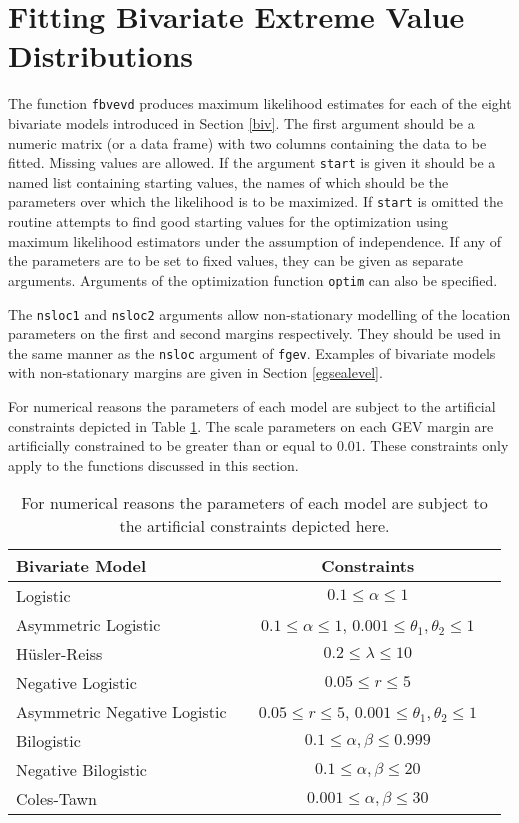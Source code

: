 \documentclass[11pt,a4paper]{article}
\begin{document}
\section{Fitting Bivariate Extreme Value Distributions}
\setcounter{footnote}{0}
\label{bivfit}

The function \verb+fbvevd+ produces maximum likelihood estimates for each of the eight bivariate models introduced in Section \ref{biv}.
The first argument should be a numeric matrix (or a data frame) with two columns containing the data to be fitted.
Missing values are allowed.
If the argument \verb+start+ is given it should be a named list containing starting values, the names of which should be the parameters over which the likelihood is to be maximized.
If \verb+start+ is omitted the routine attempts to find good starting values for the optimization using maximum likelihood estimators under the assumption of independence.
If any of the parameters are to be set to fixed values, they can be given as separate arguments.
Arguments of the optimization function \verb+optim+ can also be specified.

The \verb+nsloc1+ and \verb+nsloc2+ arguments allow non-stationary modelling of the location parameters on the first and second margins respectively.
They should be used in the same manner as the \verb+nsloc+ argument of \verb+fgev+.
Examples of bivariate models with non-stationary margins are given in Section \ref{egsealevel}.

For numerical reasons the parameters of each model are subject to the artificial constraints depicted in Table \ref{contab}. The scale parameters on each GEV margin are artificially constrained to be greater than or equal to $0.01$. These constraints only apply to the functions discussed in this section.

\begin{table}
\begin{center}
\begin{tabular}{l|c} 
Bivariate Model        & Constraints            \\ \hline
Logistic       & $0.1\leq\alpha\leq1$        \\
Asymmetric Logistic      & $0.1\leq\alpha\leq1$, $0.001\leq\theta_1,\theta_2\leq1$         \\
H\"{u}sler-Reiss       & $0.2\leq\lambda\leq10$         \\
Negative Logistic       &  $0.05\leq r \leq5$       \\
Asymmetric Negative Logistic     & $\quad0.05\leq r \leq5$, $0.001\leq\theta_1,\theta_2\leq1\quad$         \\
Bilogistic  &   $0.1\leq\alpha,\beta\leq0.999$ \\
Negative Bilogistic   &  $0.1\leq\alpha,\beta\leq20$ \\
Coles-Tawn & $0.001\leq\alpha,\beta\leq30$ \\ \hline
\end{tabular}
\caption{For numerical reasons the parameters of each model are subject to the artificial constraints depicted here.}
\label{contab}
\end{center}
\end{table}
\end{document}

